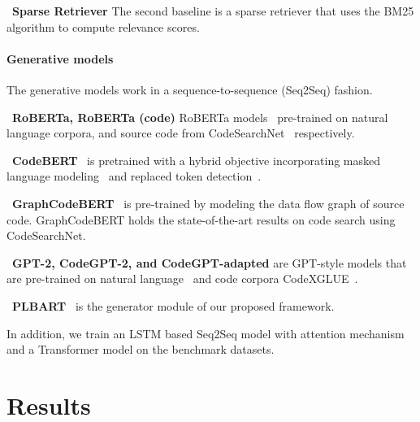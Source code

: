 \documentclass[11pt]{article}
\begin{document}
\noindent~\textbf{Sparse Retriever\hspace{0.5em}}
The second baseline is a sparse retriever that uses the BM25 algorithm to compute relevance scores.






\vspace{-1mm}
\paragraph{Generative models}
The generative models work in a sequence-to-sequence (Seq2Seq) fashion.



\noindent~\textbf{RoBERTa, RoBERTa (code)\hspace{0.5em}} 
RoBERTa  models~\cite{liu2019roberta} pre-trained on natural language corpora, and source code from CodeSearchNet~\cite{husain2019codesearchnet} respectively.


\noindent~{\textbf{CodeBERT}~\cite{feng2020codebert} \hspace{0.5em}} 
is pretrained with a hybrid objective incorporating masked language modeling~\cite{devlin2018bert} and replaced token detection~\cite{clark2020electra}. 

\noindent~{\textbf{GraphCodeBERT}~\cite{guo2020graphcodebert} \hspace{0.5em}} is pre-trained by modeling the data flow graph of source code. GraphCodeBERT holds the state-of-the-art results on code search using CodeSearchNet.




\noindent~\textbf{GPT-2, CodeGPT-2, and CodeGPT-adapted \hspace{0.5em}}
are GPT-style models that are pre-trained on natural language~\cite{radford2019language} and code corpora CodeXGLUE~\cite{CodeXGLUE}.


\noindent~{\textbf{PLBART}~\cite{ahmad2021unified}\hspace{0.5em}} is the generator module of our proposed framework.




In addition, we train an LSTM based Seq2Seq model with attention mechanism~\cite{luong-etal-2015-effective} and a Transformer model \cite{vaswani2017attention} on the benchmark datasets. 






 \section{Results}
\end{document}
